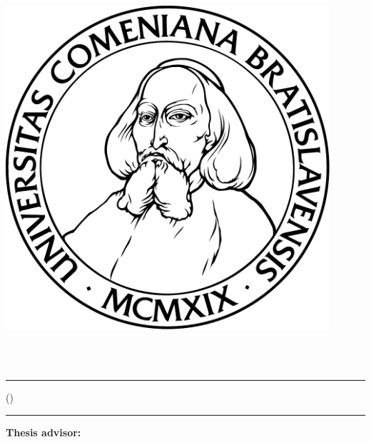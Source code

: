 \ifx\draft\undefined
\thispagestyle{empty}
\noindent
\begin{minipage}{0.20\textwidth}
	\includegraphics[width=0.9\textwidth]{../figures/logouni}
\end{minipage}
\begin{minipage}{0.79\textwidth}
	\begin{center}
		\sc \mfuniversity \\
		\mffaculty \\
		\mfdepartment  
	\end{center}
\end{minipage}
\vfill
\begin{center}
	\begin{minipage}{0.8\textwidth}
		\hrule
		\bigskip\bigskip
		\centerline{\LARGE\sc\mftitlea}
		\centerline{\LARGE\sc\mftitleb}
		\smallskip
		\centerline{(\mfthesistype)}
		\bigskip
		\bigskip
		\centerline{\large\sc\mfauthor}
		\bigskip\bigskip
		\hrule
	\end{minipage}
\end{center}
\afterpage{\blankpage}
\vfill
{\bf Thesis advisor:} \mfadvisor
\hfill\mfplacedate
\eject %

\fi


